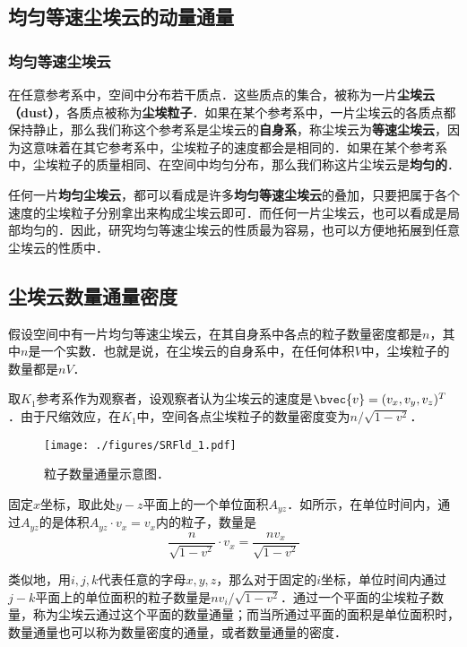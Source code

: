 

\subsection{均匀等速尘埃云的动量通量}

\subsubsection{均匀等速尘埃云}

在任意参考系中，空间中分布若干质点．这些质点的集合，被称为一片\textbf{尘埃云（dust）}，各质点被称为\textbf{尘埃粒子}．如果在某个参考系中，一片尘埃云的各质点都保持静止，那么我们称这个参考系是尘埃云的\textbf{自身系}，称尘埃云为\textbf{等速尘埃云}，因为这意味着在其它参考系中，尘埃粒子的速度都会是相同的．如果在某个参考系中，尘埃粒子的质量相同、在空间中均匀分布，那么我们称这片尘埃云是\textbf{均匀的}．

任何一片\textbf{均匀尘埃云}，都可以看成是许多\textbf{均匀等速尘埃云}的叠加，只要把属于各个速度的尘埃粒子分别拿出来构成尘埃云即可．而任何一片尘埃云，也可以看成是局部均匀的．因此，研究均匀等速尘埃云的性质最为容易，也可以方便地拓展到任意尘埃云的性质中．

\subsection{尘埃云数量通量密度}

假设空间中有一片均匀等速尘埃云，在其自身系中各点的粒子数量密度都是$n$，其中$n$是一个实数．也就是说，在尘埃云的自身系中，在任何体积$V$中，尘埃粒子的数量都是$nV$．

取$K_1$参考系作为观察者，设观察者认为尘埃云的速度是$\bvec{v}=(v_x, v_y, v_z)^T$．由于尺缩效应，在$K_1$中，空间各点尘埃粒子的数量密度变为$n/\sqrt{1-v^2}$．

\begin{figure}[ht]
\centering
\texttt{[image: ./figures/SRFld\_1.pdf]}
\caption{粒子数量通量示意图．} \label{SRFld_fig1}
\end{figure}

固定$x$坐标，取此处$y-z$平面上的一个单位面积$A_{yz}$．如所示，在单位时间内，通过$A_{yz}$的是体积$A_{yz}\cdot v_x=v_x$内的粒子，数量是
\begin{equation}
\frac{n}{\sqrt{1-v^2}}\cdot v_x=\frac{nv_x}{\sqrt{1-v^2}}
\end{equation}

类似地，用$i, j, k$代表任意的字母$x, y, z$，那么对于固定的$i$坐标，单位时间内通过$j-k$平面上的单位面积的粒子数量是$nv_i/\sqrt{1-v^2}$．通过一个平面的尘埃粒子数量，称为尘埃云通过这个平面的数量通量；而当所通过平面的面积是单位面积时，数量通量也可以称为数量密度的通量，或者数量通量的密度．

